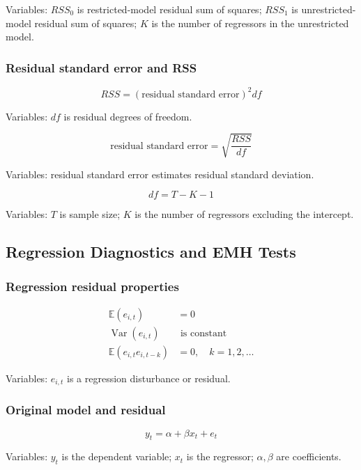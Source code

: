 \documentclass[
  8pt,
  twocolumn]{extarticle}
\begin{document}
Variables: \(RSS_0\) is restricted-model residual sum of squares;
\(RSS_1\) is unrestricted-model residual sum of squares; \(K\) is the
number of regressors in the unrestricted model.

\subsubsection{Residual standard error and
RSS}\label{residual-standard-error-and-rss}

\[
RSS=(\text{residual standard error})^2df
\]

Variables: \(df\) is residual degrees of freedom.

\[
\text{residual standard error}=\sqrt{\frac{RSS}{df}}
\]

Variables: residual standard error estimates residual standard
deviation.

\[
df=T-K-1
\]

Variables: \(T\) is sample size; \(K\) is the number of regressors
excluding the intercept.

\subsection{Regression Diagnostics and EMH
Tests}\label{regression-diagnostics-and-emh-tests}

\subsubsection{Regression residual
properties}\label{regression-residual-properties}

\[
\begin{aligned}
\mathbb E(e_{i,t})&=0\\
\operatorname{Var}(e_{i,t})&\text{ is constant}\\
\mathbb E(e_{i,t}e_{i,t-k})&=0,\quad k=1,2,\ldots
\end{aligned}
\]

Variables: \(e_{i,t}\) is a regression disturbance or residual.

\subsubsection{Original model and
residual}\label{original-model-and-residual}

\[
y_t=\alpha+\beta x_t+e_t
\]

Variables: \(y_t\) is the dependent variable; \(x_t\) is the regressor;
\(\alpha,\beta\) are coefficients.
\end{document}
